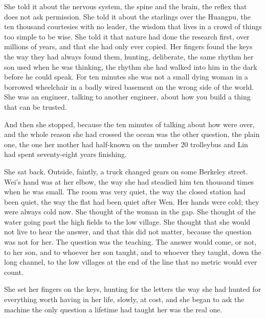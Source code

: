 She told it about the nervous system, the spine and the brain, the reflex that does not ask permission. She told it about the starlings over the Huangpu, the ten thousand courtesies with no leader, the wisdom that lives in a crowd of things too simple to be wise. She told it that nature had done the research first, over millions of years, and that she had only ever copied. Her fingers found the keys the way they had always found them, hunting, deliberate, the same rhythm her son used when he was thinking, the rhythm she had walked into him in the dark before he could speak. For ten minutes she was not a small dying woman in a borrowed wheelchair in a badly wired basement on the wrong side of the world. She was an engineer, talking to another engineer, about how you build a thing that can be trusted.

And then she stopped, because the ten minutes of talking about how were over, and the whole reason she had crossed the ocean was the other question, the plain one, the one her mother had half-known on the number 20 trolleybus and Lin had spent seventy-eight years finishing.

She sat back. Outside, faintly, a truck changed gears on some Berkeley street. Wei's hand was at her elbow, the way she had steadied him ten thousand times when he was small. The room was very quiet, the way the closed station had been quiet, the way the flat had been quiet after Wen. Her hands were cold; they were always cold now. She thought of the woman in the gap. She thought of the water going past the high fields to the low village. She thought that she would not live to hear the answer, and that this did not matter, because the question was not for her. The question was the teaching. The answer would come, or not, to her son, and to whoever her son taught, and to whoever they taught, down the long channel, to the low villages at the end of the line that no metric would ever count.

She set her fingers on the keys, hunting for the letters the way she had hunted for everything worth having in her life, slowly, at cost, and she began to ask the machine the only question a lifetime had taught her was the real one.
